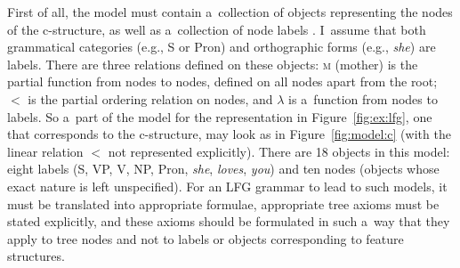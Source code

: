\documentclass[output=paper,hidelinks]{langscibook}
\begin{document}
First of all, the model must contain a~collection of objects representing the nodes of the c-structure, as well as a~collection of node labels \citep[10]{kaplan1995formal}.  I~assume that both grammatical categories (e.g., S or Pron) and orthographic forms (e.g., \emph{she}) are labels.  There are three relations defined on these objects: \textsc{m} (mother) is the partial function from nodes to nodes, defined on all nodes apart from the root; $<$ is the partial ordering relation on nodes, and $\lambda$ is a~function from nodes to labels.  So a~part of the model for the representation in Figure~\ref{fig:ex:lfg}, one that corresponds to the c-structure, may look as in Figure~\ref{fig:model:c} (with the linear relation $<$ not represented explicitly). There are 18 objects in this model: eight labels (S, VP, V, NP, Pron, \emph{she}, \emph{loves}, \emph{you}) and ten nodes (objects whose exact nature is left unspecified).  For an LFG grammar to lead to such models, it must be translated into appropriate formulae, appropriate tree axioms must be stated explicitly, and these axioms should be formulated in such a~way that they apply to tree nodes and not to labels or objects corresponding to feature structures.
\end{document}

